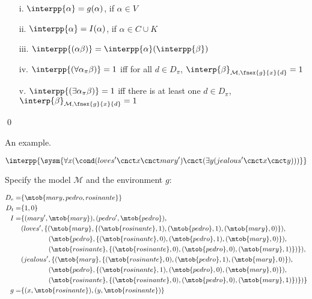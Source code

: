 \documentclass[11pt,a4paper,draft]{article}
\begin{document}
\begin{udefinition}[Semantics of $L$]\label{Lsem}
\begin{itemize}
\item[]
\item[i.] $\interpp{\alpha} = g(\alpha)$, if $\alpha \in V$
\item[ii.] $\interpp{\alpha} = I(\alpha)$, if $\alpha \in C \cup K$
\item[iii.] $\interpp{(\alpha\beta)} = \interpp{\alpha}(\interpp{\beta})$
\item[iv.]$\interpp{(\forall \alpha_{\pi} \beta)} = 1$ iff for all $d \in D_{\pi}$, $\interp{\beta}_{\mathcal{M},\fnex{g}{x}{d}} = 1$ 
\item[v.] $\interpp{(\exists \alpha_{\pi} \beta)} = 1$ iff there is at least one $d \in D_{\pi}$, $\interp{\beta}_{\mathcal{M},\fnex{g}{x}{d}} = 1$ 
\end{itemize}

\qed
\end{udefinition}

An example. 

$$
\interpp{\sysm{\forall x (\cond (loves'\cnct x\cnct mary')\cnct (\exists y (jealous'\cnct x\cnct y)))}}
$$

Specify the model $\mathcal{M}$ and the environment $g$:

\begin{align*}
D_e  = & \{\mtob{mary,pedro,rosinante}\} \\
D_t  = & \{1,0\}\\
I    = & \{(mary',\mtob{mary}), (pedro',\mtob{pedro}),\\
       & (loves',\{(\mtob{mary},\{(\mtob{rosinante}, 1), (\mtob{pedro}, 1), (\mtob{mary}, 0)\}),\\
	   & \quad\quad\quad\quad (\mtob{pedro}, \{(\mtob{rosinante}, 0), (\mtob{pedro}, 1), (\mtob{mary}, 0)\}), \\
	   & \quad\quad\quad\quad (\mtob{rosinante}, \{(\mtob{rosinante}, 0), (\mtob{pedro}, 0), (\mtob{mary}, 1)\})\}), \\
       & (jealous',\{(\mtob{mary},\{(\mtob{rosinante}, 0), (\mtob{pedro}, 1), (\mtob{mary}, 0)\}),\\
	   & \quad\quad\quad\quad (\mtob{pedro}, \{(\mtob{rosinante}, 1), (\mtob{pedro}, 0), (\mtob{mary}, 0)\}), \\
	   & \quad\quad\quad\quad (\mtob{rosinante}, \{(\mtob{rosinante}, 0), (\mtob{pedro}, 0), (\mtob{mary}, 1)\})\})\}\\
g	 = & \{(x,\mtob{rosinante}),(y,\mtob{rosinante})\}
\end{align*}
\end{document}
